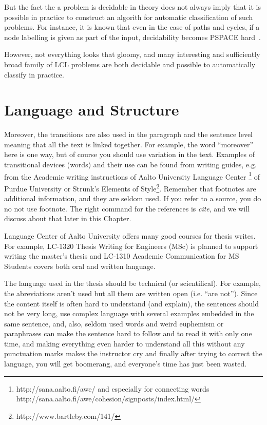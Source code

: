 But the fact the a problem is decidable in theory does not
always imply that it is possible in practice to
construct an algorith for automatic classification of
such problems. For instance, it is known that even in
the case of paths and cycles, if a node labelling is
given as part of the input, decidability becomes
PSPACE hard~\cite{Balliu2018}.

However, not everything looks that gloomy, and many
interesting and sufficiently broad family of LCL
problems are both decidable and possible to
automatically classify in practice. 





\section{Language and Structure}

Moreover, the transitions are also used in the paragraph and the
sentence level meaning that all the text is linked together. For example,
the word ``moreover'' here is one way, but of course you should use
variation in the text. Examples of transitional devices (words) and
their use can be found from writing guides, e.g. from the Academic
writing instructions of Aalto
University Language Center
\footnote{http://sana.aalto.fi/awe/ and especially for connecting words 
http://sana.aalto.fi/awe/cohesion/signposts/index.html/} of
Purdue University or Strunk's Elements of
Style\footnote{http://www.bartleby.com/141/}. Remember that footnotes
are additional information, and they are seldom used.  If you refer to a source, you do no
not use footnote. The right command for the references is \emph{cite},
and we will discuss about that later in this Chapter. 

Language Center of Aalto University offers many good courses for
thesis writes. For example, LC-1320 Thesis Writing for Engineers (MSc)
is planned to support writing the master's thesis 
and LC-1310 Academic Communication for MS Students covers both oral
and written language.

The language used in the thesis should be technical (or
scientifical). For example, the abreviations aren't used but all them
are written open (i.e. ``are not''). Since the content itself is often
hard to understand (and explain), the sentences should not be very
long, use complex language with several examples embedded in the same
sentence, and, also, seldom used words and weird euphemism or paraphrases
can make the sentence hard to follow and to read it with only one
time, and making everything even harder to understand all this without
any punctuation marks makes the instructor cry and finally after
trying to correct the language, you will get boomerang, and everyone's
time has just been wasted.

